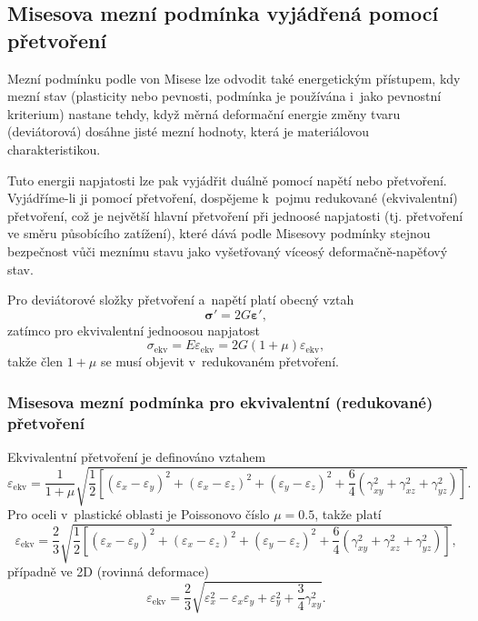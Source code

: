 
\subsection{Misesova mezní podmínka vyjádřená pomocí přetvoření}
Mezní podmínku podle von Misese lze odvodit také energetickým přístupem, kdy mezní stav (plasticity nebo pevnosti, podmínka je používána i~jako pevnostní kriterium) nastane tehdy, když měrná deformační energie změny tvaru (deviátorová) dosáhne jisté mezní hodnoty, která je materiálovou charakteristikou.

Tuto energii napjatosti lze pak vyjádřit duálně pomocí napětí nebo přetvoření.
Vyjádříme-li ji pomocí přetvoření, dospějeme k~pojmu redukované (ekvivalentní) přetvoření, což je největší hlavní přetvoření při jednoosé napjatosti (tj. přetvoření ve směru působícího zatížení), které dává podle Misesovy podmínky stejnou bezpečnost vůči meznímu stavu jako vyšetřovaný víceosý deformačně-napěťový stav. 

Pro deviátorové složky přetvoření a~napětí platí obecný vztah
\begin{equation}
	\bm{\sigma}' = 2 G \bm{\varepsilon}',
\end{equation}
zatímco pro ekvivalentní jednoosou napjatost
\begin{equation}
	\sigma_\text{ekv} = E \varepsilon_\text{ekv} = 2 G (1+\mu) \varepsilon_\text{ekv},
\end{equation}
takže člen $1+\mu$ se musí objevit v~redukovaném přetvoření.

\subsubsection{Misesova mezní podmínka pro ekvivalentní (redukované) přetvoření}
Ekvivalentní přetvoření je definováno vztahem
\begin{equation}
	\varepsilon_\text{ekv} = \frac{1}{1+\mu} \sqrt{\frac{1}{2} \left[ (\varepsilon_x-\varepsilon_y)^2 + (\varepsilon_x-\varepsilon_z)^2 + (\varepsilon_y-\varepsilon_z)^2 + \frac{6}{4} \left( \gamma_{xy}^2 + \gamma_{xz}^2 + \gamma_{yz}^2 \right) \right]}.
\end{equation}
Pro oceli v~plastické oblasti je Poissonovo číslo $\mu=\num{0.5}$, takže platí
\begin{equation}
	\varepsilon_\text{ekv} = \frac{2}{3} \sqrt{\frac{1}{2} \left[ (\varepsilon_x-\varepsilon_y)^2 + (\varepsilon_x-\varepsilon_z)^2 + (\varepsilon_y-\varepsilon_z)^2 + \frac{6}{4} \left( \gamma_{xy}^2 + \gamma_{xz}^2 + \gamma_{yz}^2 \right) \right]},
\end{equation}
případně ve 2D (rovinná deformace)
\begin{equation}
	\varepsilon_\text{ekv} = \frac{2}{3} \sqrt{ \varepsilon_x^2 - \varepsilon_x\varepsilon_y + \varepsilon_y^2 + \frac{3}{4} \gamma_{xy}^2 }.
\end{equation}

